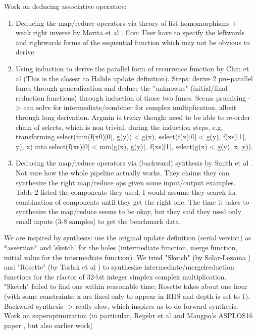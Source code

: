 Work on deducing associative operators: \\
\begin{enumerate}
	\item Deducing the map/reduce operators via theory of list homomorphisms + weak right inverse by Morita et al \cite{Morita:2007:AIG:1250734.1250752}. Con: User have to specify the leftwards and rightwards forms of the sequential function which may not be obvious to derive.
	\item Using induction to derive the parallel form of recurrence function by Chin et al \cite{Teo:1997:DEP:266670.266697} (This is the closest to Halide update definition). Steps: derive 2 pre-parallel funcs through generalization and deduce the "unknowns" (initial/final reduction functions) through induction of those two funcs. Seems promising -> can solve for intermediate/combiner for complex multiplication, albeit through long derivation. Argmin is tricky though: need to be able to re-order chain of selects, which is non trivial, during the induction steps, e.g. transforming select(min(f(x0)[0], g(y)) < g(x), select(f(x)[0] < g(y), f(xs)[1], y), x) into select(f(xs)[0] < min(g(x), g(y)), f(xs)[1], select(g(x) < g(y), x, y)).
	\item Deducing the map/reduce operators via (backward) synthesis by Smith et al \cite{Smith:2016:MPS:2908080.2908102}. Not sure how the whole pipeline actually works. They claims they can synthesize the right map/reduce ops given some input/output examples. Table 2 listed the components they used. I would assume they search for combination of components until they get the right one. The time it takes to synthesize the map/reduce seems to be okay, but they said they used only small inputs (3-8 samples) to get the benchmark data. \\
\end{enumerate}

We are inspired by synthesis: use the original update definition (serial version) as *assertion* and 'sketch' for the holes (intermediate function, merge function, initial value for the intermediate function). We tried "Sketch" (by Solar-Lezama \cite{Solar-Lezama:2008:PSS:1714168}) and "Rosette" (by Torlak et al \cite{Torlak:2013:GSL:2509578.2509586}) to synthesize intermediate/mergelreduction functions for the rfactor of 32-bit integer simplex complex multiplication. "Sketch" failed to find one within reasonable time; Rosette takes about one hour (with some constraints: x are fixed only to appear in RHS and depth is set to 1). Backward synthesis -> really slow, which inspires us to do forward synthesis.\\

Work on superoptimization (in particular, Regehr et al \cite{Lopes:2015:PCP:2737924.2737965} and Mangpo's ASPLOS16 paper \cite{Phothilimthana:2016:SUS:2872362.2872387}, but also earlier work)


